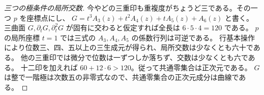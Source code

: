 \begin{proof}[三つの極条件の局所交数]
今やどの三重印も重複度がちょうど三である。その一つ $p$ を座標点にし、
$G=t^3 A_3(z)+t^2 A_4(z)+t A_5(z)+A_6(z)$ と書く。
三曲面 $G,\partial_tG,\partial_t^2G$ が固有に交わると仮定すれば全長は $6\cdot5\cdot4=120$ である。
$p$ の局所座標 $t=1$ では三式の $A_3,A_4,A_5$ の係数行列は可逆である。
行基本操作により位数三、四、五以上の三生成元が得られ、局所交数は少なくとも六十である。
他の三重印では微分で位数は一ずつしか落ちず、交数は少なくとも六である。
十二印を加えれば $60+12\cdot6>120$。従って共通零集合は正次元である。
$G$ は整で一階極は次数五の非零式なので、共通零集合の正次元成分は曲線である。
\end{proof}

